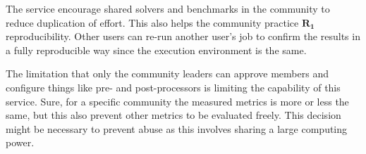 The service encourage shared solvers and benchmarks in the community to reduce duplication of effort.
This also helps the community practice $\bm{R_1}$ reproducibility.
Other users can re-run another user's job to confirm the results in a fully reproducible way since the execution environment is the same.

The limitation that only the community leaders can approve members and configure things like pre- and post-processors is limiting the capability of this service.
Sure, for a specific community the measured metrics is more or less the same, but this also prevent other metrics to be evaluated freely.
This decision might be necessary to prevent abuse as this involves sharing a large computing power.